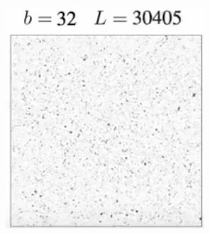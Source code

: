 \documentclass[]{article}
\begin{document}
\begin{figure}[H]
\begin{subfigure}[t]{0.3\textwidth}
	\end{subfigure}
	\begin{subfigure}[t]{0.3\textwidth}
		\includegraphics[width=\textwidth]{DouglasAshton1-3}
	\end{subfigure}
\end{figure}
\end{document}
